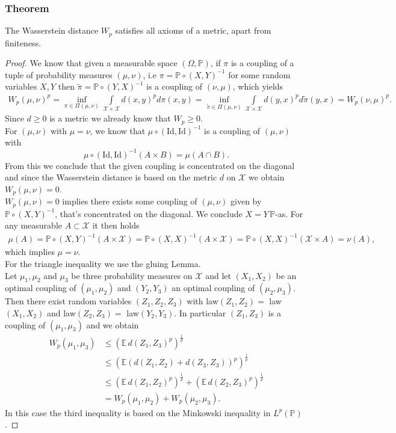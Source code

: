 \documentclass[11pt,a4paper]{article}
\begin{document}
\subsubsection{Theorem}
The Wasserstein distance $W_p$ satisfies all axioms of a metric, apart from finiteness.
\begin{proof}
We know that given a measurable space $(\Omega,\mathbb{P})$, if $\pi$ is a coupling of a tuple of probability measures $(\mu,\nu)$, i.e $\pi=\mathbb{P}\circ{}(X,Y)^{-1}$ for some random variables $X,Y$ then $\tilde{\pi}=\mathbb{P}\circ{}(Y,X)^{-1}$ is a coupling of $(\nu,\mu)$, which yields 
\begin{align*}
W_p(\mu,\nu)^p = \inf\limits_{\pi\in\Pi(\mu,\nu)}\int\limits_{\mathcal{X\times{}X}}d(x,y)^pd\pi(x,y) = \inf\limits_{\tilde{\pi}\in\Pi(\mu,\nu)}\int\limits_{\mathcal{X\times{}X}}d(y,x)^pd\tilde{\pi}(y,x) = W_p(\nu,\mu)^p. 
\end{align*}
Since $d\geq{}0$ is a metric we already know that $W_p\geq{}0$. \vspace{1em}\\
For $(\mu,\nu)$ with $\mu=\nu$, we know that $\mu\circ{}(\text{Id},\text{Id})^{-1}$ is a coupling of $(\mu,\nu)$ with 
\[
\mu\circ(\text{Id},\text{Id})^{-1}(A\times{}B) = \mu(A\cap{}B).
\]
From this we conclude that the given coupling is concentrated on the diagonal and since the Wasserstein distance is based on the metric $d$ on $\mathcal{X}$ we obtain $W_p(\mu,\nu)=0$.\vspace{1em}\\
$W_p(\mu,\nu)=0$ implies there exists some coupling of $(\mu,\nu)$ given by $\mathbb{P}\circ{}(X,Y)^{-1}$, that's concentrated on the diagonal. We conclude $X = Y\,\mathbb{P}$-as. For any measurable $A\subset\mathcal{X}$ it then holds
\begin{align*}
\mu(A)=\mathbb{P}\circ(X,Y)^{-1}(A\times\mathcal{X}) = \mathbb{P}\circ(X,X)^{-1}(A\times\mathcal{X}) = \mathbb{P}\circ(X,X)^{-1}(\mathcal{X}\times{}A)=\nu(A),
\end{align*}
which implies $\mu=\nu.$\vspace{1em}\\
For the triangle inequality we use the gluing Lemma.\\
Let $\mu_1,\mu_2$ and $\mu_3$ be three probability measures on $\mathcal{X}$ and let $(X_1,X_2)$ be an optimal coupling of $(\mu_1,\mu_2)$ and $(Y_2,Y_3)$ an optimal coupling of $(\mu_2,\mu_3)$. Then there exist random variables $(Z_1,Z_2,Z_3)$ with law$(Z_1,Z_2)=\,\,$law$(X_1,X_2)$ and law$(Z_2,Z_3)=\,\,$law$(Y_2,Y_3)$. In particular $(Z_1,Z_3)$ is a coupling of $(\mu_1,\mu_3)$ and we obtain 
\begin{align*}
W_p(\mu_1,\mu_3) &\leq \left(\mathbb{E}\,d(Z_1,Z_3)^p \right)^\frac{1}{p} \\ & \leq \left(\mathbb{E}(d(Z_1,Z_2) + d(Z_3,Z_3))^p\right)^\frac{1}{p} \\ & \leq \left(\mathbb{E}\,d(Z_1,Z_2)^p\right)^\frac{1}{p} + \left(\mathbb{E}\,d(Z_2,Z_3)^p\right)^\frac{1}{p} \\ & = W_p(\mu_1,\mu_2) + W_p(\mu_2,\mu_3).
\end{align*} 
In this case the third inequality is based on the Minkowski inequality in $L^p(\mathbb{P})$.
\end{proof} 
\end{document}
